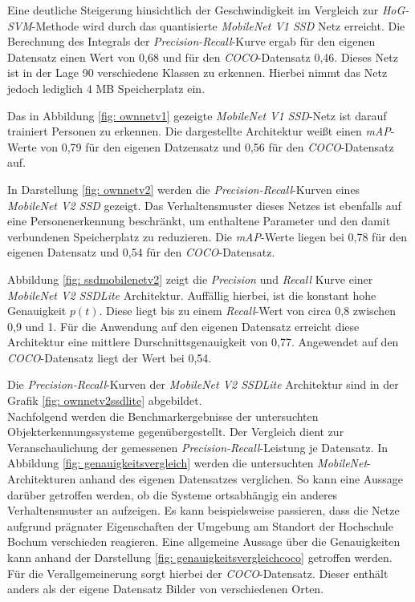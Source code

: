 

Eine deutliche Steigerung hinsichtlich der Geschwindigkeit im Vergleich zur \textit{HoG-SVM}-Methode wird durch das quantisierte \textit{MobileNet V1 SSD} Netz erreicht. Die Berechnung des Integrals der \textit{Precision-Recall}-Kurve ergab für den eigenen Datensatz einen Wert von 0,68 und für den \textit{COCO}-Datensatz 0,46. Dieses Netz ist in der Lage 90 verschiedene Klassen zu erkennen. Hierbei nimmt das Netz jedoch lediglich 4 MB Speicherplatz ein.



Das in Abbildung \ref{fig: ownnetv1} gezeigte \textit{MobileNet V1 SSD}-Netz ist darauf trainiert Personen zu erkennen. Die dargestellte Architektur weißt einen \textit{mAP}-Werte von 0,79 für den eigenen Datzensatz und 0,56 für den \textit{COCO}-Datensatz auf.



In Darstellung \ref{fig: ownnetv2} werden die \textit{Precision-Recall}-Kurven eines \textit{MobileNet V2 SSD} gezeigt. Das Verhaltensmuster dieses Netzes ist ebenfalls auf eine Personenerkennung beschränkt, um enthaltene Parameter und den damit verbundenen Speicherplatz zu reduzieren. Die \textit{mAP}-Werte liegen bei 0,78 für den eigenen Datensatz und 0,54 für den \textit{COCO}-Datensatz. 



Abbildung \ref{fig: ssdmobilenetv2} zeigt die \textit{Precision} und \textit{Recall} Kurve einer \textit{MobileNet V2 SSDLite} Architektur. Auffällig hierbei, ist die konstant hohe Genauigkeit $p(t)$. Diese liegt bis zu einem \textit{Recall}-Wert von circa 0,8 zwischen 0,9 und 1. Für die Anwendung auf den eigenen Datensatz erreicht diese Architektur eine mittlere Durschnittsgenauigkeit von 0,77. Angewendet auf den \textit{COCO}-Datensatz liegt der Wert bei 0,54. 

 

 
  
Die \textit{Precision-Recall}-Kurven der \textit{MobileNet V2 SSDLite} Architektur sind in der Grafik \ref{fig: ownnetv2ssdlite} abgebildet. \\

Nachfolgend werden die Benchmarkergebnisse der untersuchten Objekterkennungssysteme gegenübergestellt. Der Vergleich dient zur Veranschaulichung der gemessenen \textit{Precision-Recall}-Leistung je Datensatz. In Abbildung \ref{fig: genauigkeitsvergleich} werden die untersuchten \textit{MobileNet}-Architekturen anhand des eigenen Datensatzes verglichen. So kann eine Aussage darüber getroffen werden, ob die Systeme ortsabhängig ein anderes Verhaltensmuster an aufzeigen. Es kann beispielsweise passieren, dass die Netze aufgrund prägnater Eigenschaften der Umgebung am Standort der Hochschule Bochum verschieden reagieren. Eine allgemeine Aussage über die Genauigkeiten kann anhand der Darstellung \ref{fig: genauigkeitsvergleichcoco} getroffen werden. Für die Verallgemeinerung sorgt hierbei der \textit{COCO}-Datensatz. Dieser enthält anders als der eigene Datensatz Bilder von verschiedenen Orten.     


